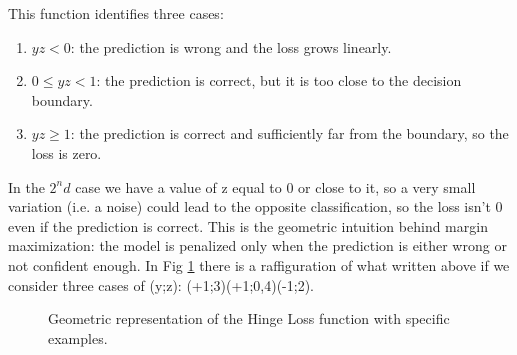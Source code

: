 This function identifies three cases:
\begin{enumerate}
    \item $yz < 0$: the prediction is wrong and the loss grows linearly.
    \item $0 \leq yz < 1$: the prediction is correct, but it is too close to the decision boundary.
    \item $yz \geq 1$: the prediction is correct and sufficiently far from the boundary, so the loss is zero.
\end{enumerate}
In the $2^nd$ case we have a value of z equal to 0 or close to it, so a very small variation (i.e. a noise)
could lead to the opposite classification, so the loss isn't 0 even if the prediction is correct.
This is the geometric intuition behind margin maximization: the model is penalized only when the prediction is either wrong or not confident enough.
In Fig \ref{fig:hinge_loss} there is a raffiguration of what written above if we consider three cases of (y;z): (+1;3)(+1;0,4)(-1;2).
\begin{figure}[H]
    \centering
    \caption{Geometric representation of the Hinge Loss function with specific examples.}
    \label{fig:hinge_loss}
\end{figure}

